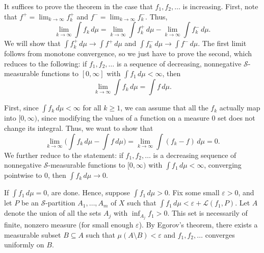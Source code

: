 \documentclass[11pt,oneside]{book}
\begin{document}
\begin{solution}
    It suffices to prove the theorem in the case that $f_1, f_2, \ldots$ is increasing. First, note that $f^+ = \lim_{k \to \infty} f_k^+$ and $f^- = \lim_{k \to \infty} f_k^-$. Thus, \[\lim_{k \to \infty} \int f_k \, d\mu = \lim_{k \to \infty} \int f_k^+ \, d\mu - \lim_{k \to \infty} \int f_k^- \, d\mu.\] We will show that $\int f_k^+ \, d\mu \to \int f^+ \, d\mu$ and $\int f_k^- \, d\mu \to \int f^- \, d\mu$. The first limit follows from monotone convergence, so we just have to prove the second, which reduces to the following: if $f_1, f_2, \ldots$ is a sequence of decreasing, nonnegative $\mathscr{S}$-measurable functions to $[0, \infty]$ with $\int f_1 \, d\mu < \infty$, then \[\lim_{k \to \infty} \int f_k \, d\mu = \int f \, d\mu.\]

    First, since $\int f_k \, d\mu < \infty$ for all $k \geq 1$, we can assume that all the $f_k$ actually map into $[0, \infty)$, since modifying the values of a function on a measure $0$ set does not change its integral. Thus, we want to show that \[\lim_{k \to \infty} \bigg( \int f_k \, d\mu - \int f \, d\mu \bigg) = \lim_{k \to \infty} \int (f_k - f) \, d\mu = 0.\] We further reduce to the statement: if $f_1, f_2, \ldots$ is a decreasing sequence of nonnegative $\mathscr{S}$-measurable functions to $[0, \infty)$ with $\int f_1 \, d\mu < \infty$, converging pointwise to $0$, then $\int f_k \, d\mu \to 0$.

    If $\int f_1 \, d\mu = 0$, are done. Hence, suppose $\int f_1 \, d\mu > 0$. Fix some small $\varepsilon > 0$, and let $P$ be an $\mathscr{S}$-partition $A_1, \ldots, A_m$ of $X$ such that $\int f_1 \, d\mu < \varepsilon + \mathscr{L}(f_1, P)$. Let $A$ denote the union of all the sets $A_j$ with $\inf_{A_j} f_1 > 0$. This set is necessarily of finite, nonzero measure (for small enough $\varepsilon$). By Egorov's theorem, there exists a measurable subset $B \subseteq A$ such that $\mu(A\setminus B) < \varepsilon$ and $f_1, f_2, \ldots$ converges uniformly on $B$.


\end{solution}
\end{document}
